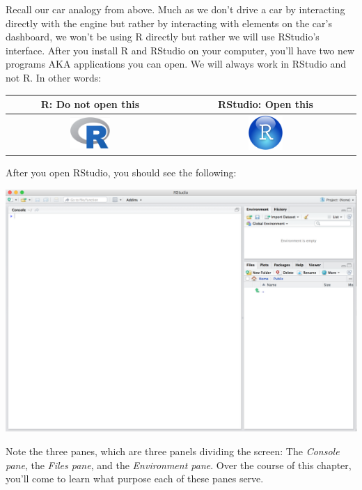 \documentclass[12pt, krantz2,]{krantz}
\begin{document}
Recall our car analogy from above. Much as we don't drive a car by interacting directly with the engine but rather by interacting with elements on the car's dashboard, we won't be using R directly but rather we will use RStudio's interface. After you install R and RStudio on your computer, you'll have two new programs AKA applications you can open. We will always work in RStudio and not R. In other words:

\begin{longtable}[]{@{}cc@{}}
\toprule
R: Do not open this & RStudio: Open this\tabularnewline
\midrule
\endhead
\includegraphics[width=0.25\textwidth,height=\textheight]{images/Rlogo.png} & \includegraphics[width=0.2\textwidth,height=\textheight]{images/RStudio-Ball.png}\tabularnewline
\bottomrule
\end{longtable}

After you open RStudio, you should see the following:

\includegraphics{images/rstudio.png}

Note the three panes, which are three panels dividing the screen: The \emph{Console pane}, the \emph{Files pane}, and the \emph{Environment pane}. Over the course of this chapter, you'll come to learn what purpose each of these panes serve.
\end{document}
